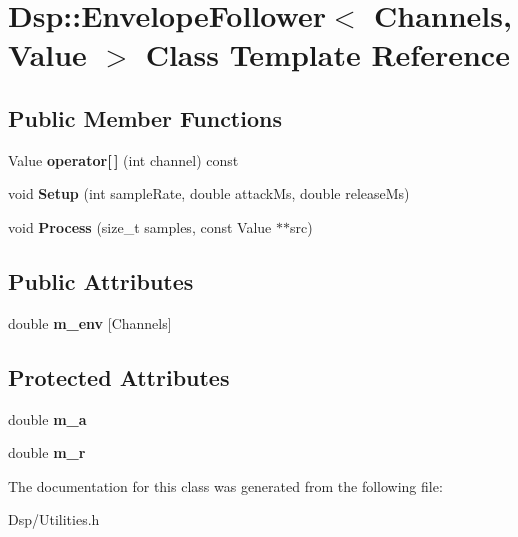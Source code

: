 \hypertarget{classDsp_1_1EnvelopeFollower}{\section{Dsp\-:\-:Envelope\-Follower$<$ Channels, Value $>$ Class Template Reference}
\label{classDsp_1_1EnvelopeFollower}
}
\subsection*{Public Member Functions}
\begin{DoxyCompactItemize}
\item 
\hypertarget{classDsp_1_1EnvelopeFollower_afeac187890408aceb1a26e58e1037ca7}{Value {\bfseries operator\mbox{[}$\,$\mbox{]}} (int channel) const }\label{classDsp_1_1EnvelopeFollower_afeac187890408aceb1a26e58e1037ca7}

\item 
\hypertarget{classDsp_1_1EnvelopeFollower_a1cc26737bf5cd597297886501aa40dc1}{void {\bfseries Setup} (int sample\-Rate, double attack\-Ms, double release\-Ms)}\label{classDsp_1_1EnvelopeFollower_a1cc26737bf5cd597297886501aa40dc1}

\item 
\hypertarget{classDsp_1_1EnvelopeFollower_ac47dac5e354cf49de891131438598668}{void {\bfseries Process} (size\-\_\-t samples, const Value $\ast$$\ast$src)}\label{classDsp_1_1EnvelopeFollower_ac47dac5e354cf49de891131438598668}

\end{DoxyCompactItemize}
\subsection*{Public Attributes}
\begin{DoxyCompactItemize}
\item 
\hypertarget{classDsp_1_1EnvelopeFollower_a29e108ad7aebfacfb03c12b1376e80ab}{double {\bfseries m\-\_\-env} \mbox{[}Channels\mbox{]}}\label{classDsp_1_1EnvelopeFollower_a29e108ad7aebfacfb03c12b1376e80ab}

\end{DoxyCompactItemize}
\subsection*{Protected Attributes}
\begin{DoxyCompactItemize}
\item 
\hypertarget{classDsp_1_1EnvelopeFollower_a16f1390002e44dea910c9002dd08016a}{double {\bfseries m\-\_\-a}}\label{classDsp_1_1EnvelopeFollower_a16f1390002e44dea910c9002dd08016a}

\item 
\hypertarget{classDsp_1_1EnvelopeFollower_ab60d2a0541ae61eaea8d1dee51dfff36}{double {\bfseries m\-\_\-r}}\label{classDsp_1_1EnvelopeFollower_ab60d2a0541ae61eaea8d1dee51dfff36}

\end{DoxyCompactItemize}


The documentation for this class was generated from the following file\-:\begin{DoxyCompactItemize}
\item 
Dsp/Utilities.\-h\end{DoxyCompactItemize}
